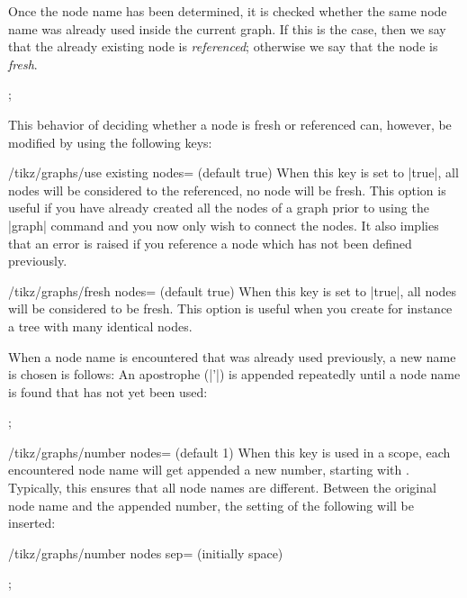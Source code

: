 Once the node name has been determined, it is checked whether the same node
name was already used inside the current graph. If this is the case, then we
say that the already existing node is \emph{referenced}; otherwise we say that
the node is \emph{fresh}.
%
\begin{codeexample}[preamble={\usetikzlibrary{graphs}}]
\tikz {};
\end{codeexample}

This behavior of deciding whether a node is fresh or referenced can, however,
be modified by using the following keys:
%
\begin{key}{/tikz/graphs/use existing nodes= (default true)}
    When this key is set to |true|, all nodes will be considered to the
    referenced, no node will be fresh. This option is useful if you have
    already created all the nodes of a graph prior to using the |graph| command
    and you now only wish to connect the nodes. It also implies that an error
    is raised if you reference a node which has not been defined previously.
\end{key}

\begin{key}{/tikz/graphs/fresh nodes= (default true)}
    When this key is set to |true|, all nodes will be considered to be fresh.
    This option is useful when you create for instance a tree with many
    identical nodes.

    When a node name is encountered that was already used previously, a new
    name is chosen is follows: An apostrophe (|'|) is appended repeatedly until
    a node name is found that has not yet been used:
\begin{codeexample}[preamble={\usetikzlibrary{graphs}}]
\tikz {};
\end{codeexample}
\end{key}

\begin{key}{/tikz/graphs/number nodes= (default 1)}
    When this key is used in a scope, each encountered node name will get
    appended a new number, starting with . Typically, this ensures
    that all node names are different. Between the original node name and the
    appended number, the setting of the following will be inserted:
    \begin{key}{/tikz/graphs/number nodes sep= (initially \normalfont space)}
    \end{key}
\begin{codeexample}[preamble={\usetikzlibrary{graphs}}]
\tikz {};
\end{codeexample}
\end{key}

